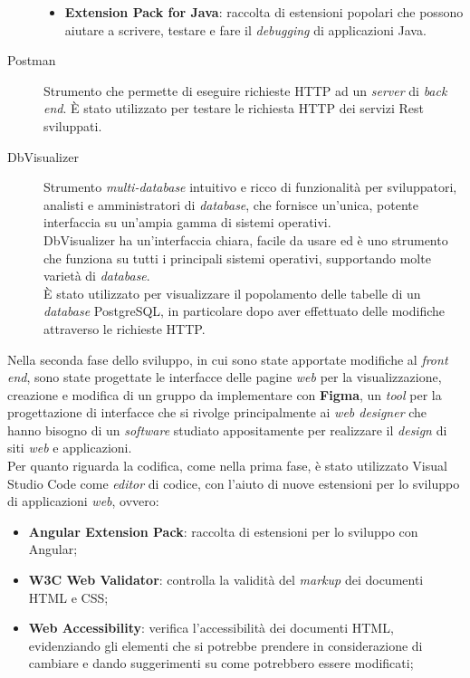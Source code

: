 \begin{description}
\begin{itemize}
                  \item \textbf{Extension Pack for Java}: raccolta di
                        estensioni popolari
                        che possono aiutare a scrivere, testare e fare il
                        \textit{debugging} di applicazioni Java.
            \end{itemize}
      \item[Postman]
            Strumento che permette di eseguire richieste HTTP ad un
            \textit{server} di \textit{back end}. È stato utilizzato per
            testare le richiesta HTTP dei servizi Rest sviluppati.
      \item[DbVisualizer] Strumento \textit{multi-database} intuitivo e ricco
            di
            funzionalità per sviluppatori, analisti e amministratori di
            \textit{database},
            che fornisce un'unica, potente interfaccia su un'ampia gamma di
            sistemi
            operativi. \\
            DbVisualizer ha un'interfaccia chiara, facile da usare ed è uno
            strumento
            che
            funziona su tutti i principali sistemi operativi, supportando molte
            varietà di
            \textit{database}. \\
            È stato utilizzato per visualizzare il popolamento delle tabelle
            di un \textit{database} PostgreSQL, in particolare dopo aver
            effettuato delle modifiche attraverso le richieste HTTP.
\end{description}

\noindent Nella seconda fase dello sviluppo, in cui sono state apportate
modifiche al
\textit{front end}, sono state progettate le interfacce delle pagine
\textit{web} per la visualizzazione, creazione e modifica di un gruppo da
implementare con \textbf{Figma}, un \textit{tool} per la progettazione di
interfacce che si rivolge principalmente ai \textit{web designer} che hanno
bisogno di un
\textit{software} studiato appositamente per realizzare il \textit{design} di
siti \textit{web} e applicazioni.\\

\noindent Per quanto riguarda la codifica, come nella prima fase, è stato
utilizzato Visual Studio
Code come \textit{editor} di codice, con l'aiuto di nuove estensioni per lo
sviluppo di applicazioni \textit{web}, ovvero:
\begin{itemize}
      \item \textbf{Angular Extension Pack}: raccolta di
            estensioni per lo sviluppo con Angular;
      \item \textbf{W3C Web Validator}: controlla la validità del
            \textit{markup} dei documenti HTML e CSS;
      \item \textbf{Web Accessibility}: verifica l'accessibilità
            dei documenti HTML, evidenziando gli elementi che si
            potrebbe prendere in considerazione di cambiare e dando
            suggerimenti su come potrebbero essere modificati;
\end{itemize}

